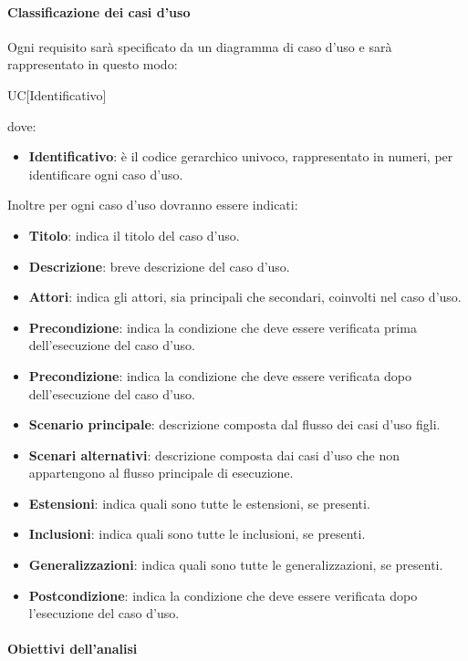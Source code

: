 \paragraph{Classificazione dei casi d'uso}
Ogni requisito sarà specificato da un diagramma di caso d'uso e sarà rappresentato in questo modo:
\begin{center}
  UC[Identificativo]
\end{center}
dove:
\begin{itemize}
  \item\textbf{Identificativo}: è il codice gerarchico univoco, rappresentato in numeri, per identificare ogni caso d'uso.
\end{itemize}
Inoltre per ogni caso d'uso dovranno essere indicati:
\begin{itemize}
  \item\textbf{Titolo}: indica il titolo del caso d'uso.
  \item\textbf{Descrizione}: breve descrizione del caso d'uso.
  \item\textbf{Attori}: indica gli attori, sia principali che secondari, coinvolti nel caso d'uso.
  \item\textbf{Precondizione}: indica la condizione che deve essere verificata prima
  dell'esecuzione del caso d'uso.
   \item\textbf{Precondizione}: indica la condizione che deve essere verificata dopo dell'esecuzione del caso d'uso.
  \item\textbf{Scenario principale}: descrizione composta dal flusso dei casi d'uso
  figli.
  \item\textbf{Scenari alternativi}: descrizione composta dai casi d'uso che non
  appartengono al flusso principale di esecuzione.
  \item\textbf{Estensioni}: indica quali sono tutte le estensioni, se presenti.
  \item\textbf{Inclusioni}: indica quali sono tutte le inclusioni, se presenti.
  \item\textbf{Generalizzazioni}: indica quali sono tutte le generalizzazioni,
  se presenti.
  \item\textbf{Postcondizione}: indica la condizione che deve essere verificata dopo
  l'esecuzione del caso d'uso.
\end{itemize}

\paragraph{Obiettivi dell'analisi}

